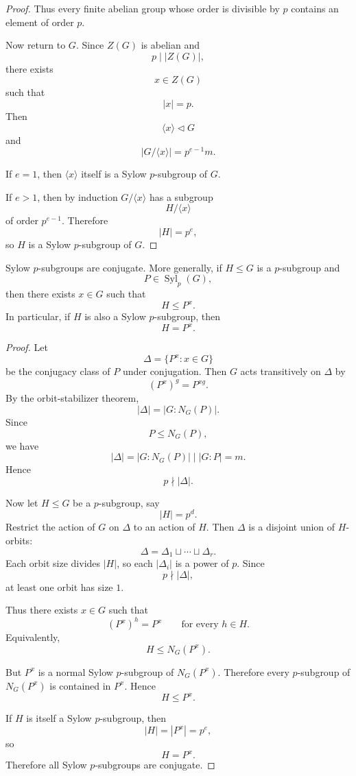 \begin{proof}
Thus every finite abelian group whose order is divisible by $p$ contains an element of order $p$.

Now return to $G$. Since $Z(G)$ is abelian and
\[
    p\mid |Z(G)|,
\]
there exists
\[
    x\in Z(G)
\]
such that
\[
    |x|=p.
\]
Then
\[
    \langle x\rangle\lhd G
\]
and
\[
    |G/\langle x\rangle|
    =
    p^{e-1}m.
\]

If $e=1$, then $\langle x\rangle$ itself is a Sylow $p$-subgroup of $G$.

If $e>1$, then by induction $G/\langle x\rangle$ has a subgroup
\[
    H/\langle x\rangle
\]
of order $p^{e-1}$. Therefore
\[
    |H|=p^e,
\]
so $H$ is a Sylow $p$-subgroup of $G$.
\end{proof}

\begin{theorem}\label{thm:second-sylow}
Sylow $p$-subgroups are conjugate. More generally, if $H\leq G$ is a $p$-subgroup and
\[
    P\in\operatorname{Syl}_p(G),
\]
then there exists $x\in G$ such that
\[
    H\leq P^x.
\]
In particular, if $H$ is also a Sylow $p$-subgroup, then
\[
    H=P^x.
\]
\end{theorem}

\begin{proof}
Let
\[
    \Delta=\{P^x:x\in G\}
\]
be the conjugacy class of $P$ under conjugation. Then $G$ acts transitively on $\Delta$ by
\[
    (P^x)^g=P^{xg}.
\]
By the orbit-stabilizer theorem,
\[
    |\Delta|
    =
    |G:N_G(P)|.
\]
Since
\[
    P\leq N_G(P),
\]
we have
\[
    |\Delta|=|G:N_G(P)|\mid |G:P|=m.
\]
Hence
\[
    p\nmid |\Delta|.
\]

Now let $H\leq G$ be a $p$-subgroup, say
\[
    |H|=p^d.
\]
Restrict the action of $G$ on $\Delta$ to an action of $H$. Then $\Delta$ is a disjoint union of $H$-orbits:
\[
    \Delta=\Delta_1\sqcup\cdots\sqcup\Delta_r.
\]
Each orbit size divides $|H|$, so each $|\Delta_i|$ is a power of $p$. Since
\[
    p\nmid |\Delta|,
\]
at least one orbit has size $1$.

Thus there exists $x\in G$ such that
\[
    (P^x)^h=P^x
    \qquad
    \text{for every }h\in H.
\]
Equivalently,
\[
    H\leq N_G(P^x).
\]

But $P^x$ is a normal Sylow $p$-subgroup of $N_G(P^x)$. Therefore every $p$-subgroup of $N_G(P^x)$ is contained in $P^x$. Hence
\[
    H\leq P^x.
\]

If $H$ is itself a Sylow $p$-subgroup, then
\[
    |H|=|P^x|=p^e,
\]
so
\[
    H=P^x.
\]
Therefore all Sylow $p$-subgroups are conjugate.
\end{proof}

